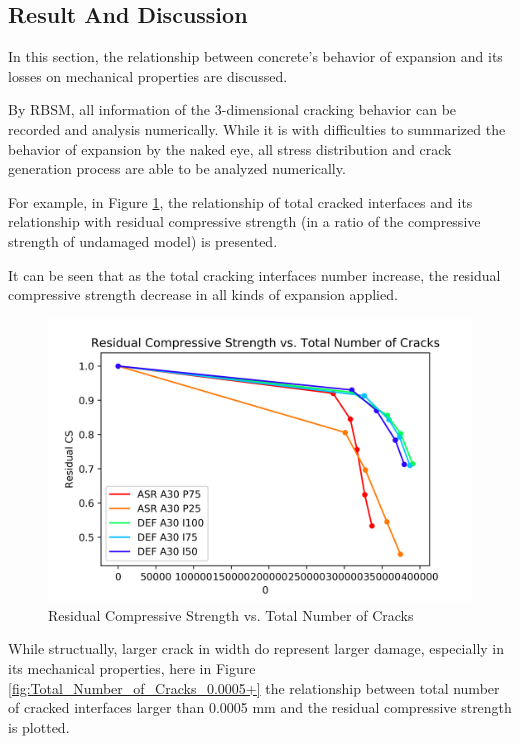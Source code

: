 \clearpage

\subsection{Result And Discussion}

In this section, the relationship between concrete's behavior of expansion and its losses on mechanical properties are discussed.

By RBSM, all information of the 3-dimensional cracking behavior can be recorded and analysis numerically. While it is with difficulties to summarized the behavior of expansion by the naked eye, all stress distribution and crack generation process are able to be analyzed numerically.

For example, in Figure \ref{fig:Total_Number_of_Cracks}, the relationship of total cracked interfaces and its relationship with residual compressive strength (in a ratio of the compressive strength of undamaged model) is presented.

It can be seen that as the total cracking interfaces number increase, the residual compressive strength decrease in all kinds of expansion applied.

\begin{figure}[ht!]
\centering
\includegraphics[width=.8\linewidth]{Files/exp_3D/Residual_Compressive_Strength_vs_Total_Number_of_Cracks.png}
  \caption{Residual Compressive Strength vs. Total Number of Cracks}
  \label{fig:Total_Number_of_Cracks}
\end{figure}

While structually, larger crack in width do represent larger damage, especially in its mechanical properties, here in Figure \ref{fig:Total_Number_of_Cracks_0.0005+} the relationship between total number of cracked interfaces larger than 0.0005 mm and the residual compressive strength is plotted.

